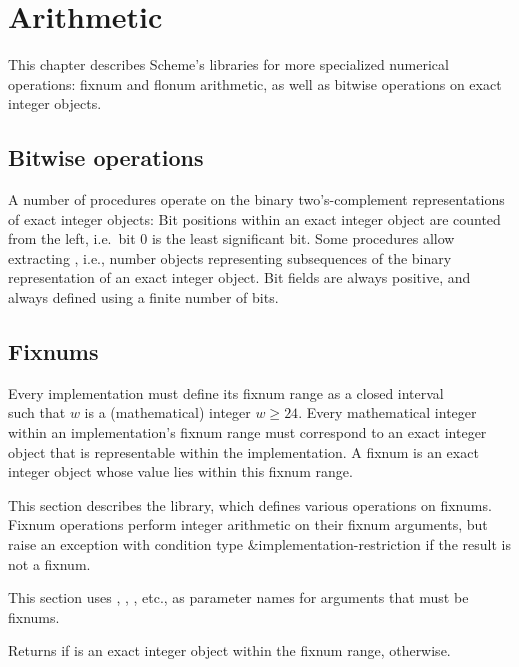 \chapter{Arithmetic}
\label{numberchapter}

This chapter describes Scheme's libraries for more specialized
numerical operations: fixnum and flonum arithmetic, as well as bitwise
operations on exact integer objects.  

\section{Bitwise operations}

A number of procedures operate on the binary two's-complement
representations of exact integer objects: Bit positions within an
exact integer object are counted from the left, i.e.\ bit 0 is the
least significant bit.  Some procedures allow extracting , i.e., number objects representing subsequences of the
binary representation of an exact integer object.  Bit fields are
always positive, and always defined using a finite number of bits.

\section{Fixnums}
\label{fixnumssection}

Every implementation must define its fixnum range as a closed
interval
%
\begin{displaymath}
[-2^{w-1}, 2^{w-1} - 1]
\end{displaymath}
%
such that $w$ is a (mathematical) integer $w \geq 24$.  Every
mathematical integer within an implementation's fixnum range must
correspond to an exact integer object that is representable within the
implementation.
A fixnum is an exact integer object whose value lies within this
fixnum range.

This section describes the  library,
which defines various operations on fixnums.
Fixnum operations perform integer arithmetic on their fixnum
arguments, but raise an exception with condition type
{\cf\&implementation-restriction} if the result is not a fixnum.

This section uses , , , etc., as parameter
names for arguments that must be fixnums.

\begin{entry}{%
}

Returns \schtrue{} if  is an exact
integer object within the fixnum range, \schfalse{} otherwise.
\end{entry}

